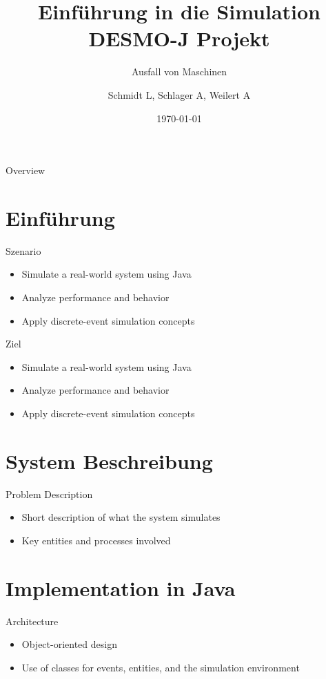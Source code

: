 \documentclass{beamer}
\title{Einführung in die Simulation\\DESMO-J Projekt}
\subtitle{Ausfall von Maschinen}
\author{Schmidt L, Schlager A, Weilert A}
\institute{Paris Lodron Universität Salzburg}
\date{\today}
\begin{document}
    \maketitle

    \begin{frame}{Overview}
        \tableofcontents
    \end{frame}

    \section{Einführung}
    \begin{frame}{Szenario}
        \begin{itemize}
            \item Simulate a real-world system using Java
            \item Analyze performance and behavior
            \item Apply discrete-event simulation concepts
        \end{itemize}
    \end{frame}

    \begin{frame}{Ziel}
        \begin{itemize}
            \item Simulate a real-world system using Java
            \item Analyze performance and behavior
            \item Apply discrete-event simulation concepts
        \end{itemize}
    \end{frame}

    \section{System Beschreibung}
    \begin{frame}{Problem Description}
        \begin{itemize}
            \item Short description of what the system simulates
            \item Key entities and processes involved
        \end{itemize}
    \end{frame}

    \section{Implementation in Java}
    \begin{frame}[fragile]{Architecture}
        \begin{itemize}
            \item Object-oriented design
            \item Use of classes for events, entities, and the simulation environment
        \end{itemize}
    \end{frame}
\end{document}
